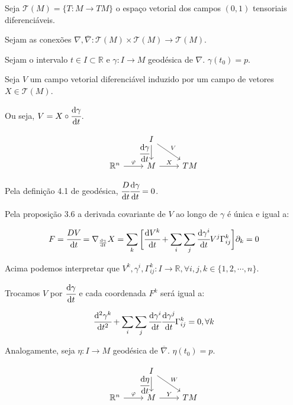 \documentclass[10pt,a4paper]{article}
\begin{document}
		Seja $\mathcal{T}(M) = \{ T: M \rightarrow TM \}$ o espa\c{c}o vetorial dos campos $(0,1)$ tensoriais diferenci\'aveis.

		Sejam as conex\~oes $\nabla, \overline{\nabla}: \mathcal{T}(M) \times \mathcal{T}(M) \rightarrow \mathcal{T}(M)$.

		Sejam o intervalo $t \in I \subset \mathbb{R}$ e $\gamma : I \rightarrow M$ geod\'esica de $\nabla$. $\gamma(t_0) = p$.

		Seja $V$ um campo vetorial diferenci\'avel induzido por um campo de vetores $X \in \mathcal{T}(M)$.

		Ou seja, $V = X \circ \cfrac{\mathrm{d} \gamma}{\mathrm{d} t}$.

		\[
		\begin{tikzcd}
		& I \arrow[swap]{d}{\cfrac{\mathrm{d} \gamma}{\mathrm{d} t}} \arrow{rd}{V} &  \\
		\mathbb{R}^n \arrow{r}{\varphi} & M \arrow{r}{X} & TM
		\end{tikzcd}
		\]

		Pela defini\c{c}\~ao 4.1 de geod\'esica, $\cfrac{D}{\mathrm{d} t} \cfrac{\mathrm{d} \gamma}{\mathrm{d} t} = 0$.

		Pela proposi\c{c}\~ao 3.6 a derivada covariante de $V$ ao longo de $\gamma$  \'e \'unica e igual a:

		\begin{align*}
		  F = \cfrac{DV}{\mathrm{d} t} = \nabla_{\frac{\mathrm{d} \gamma}{\mathrm{d} t}} X = \sum_k \bigg[ \cfrac{\mathrm{d} V^k}{\mathrm{d} t} + \sum_i \sum_j \cfrac{\mathrm{d} \gamma^i}{\mathrm{d} t} V^j \Gamma_{ij}^k \bigg] \partial_k = 0
		\end{align*}

		Acima podemos interpretar que $V^k, \gamma^i, \Gamma_{ij}^k : I \rightarrow \mathbb{R}, \forall i,j,k \in \{ 1, 2, \cdots, n \}$.

		Trocamos $V$ por $\cfrac{\mathrm{d} \gamma}{\mathrm{d} t}$ e cada coordenada $F^k$ ser\'a igual a:

		\begin{align*}
		  \cfrac{\mathrm{d}^2 \gamma^k}{\mathrm{d} t^2} + \sum_i \sum_j \cfrac{\mathrm{d} \gamma^i}{\mathrm{d} t} \cfrac{\mathrm{d} \gamma^j}{\mathrm{d} t} \Gamma_{ij}^k = 0, \forall k
		\end{align*}

		Analogamente, seja $\eta : I \rightarrow M$ geod\'esica de $\overline{\nabla}$. $\eta(t_0) = p$.

		\[
		\begin{tikzcd}
		& I \arrow[swap]{d}{\cfrac{\mathrm{d} \eta}{\mathrm{d} t}} \arrow{rd}{W} &  \\
		\mathbb{R}^n \arrow{r}{\varphi} & M \arrow{r}{Y} & TM
		\end{tikzcd}
		\]
\end{document}
